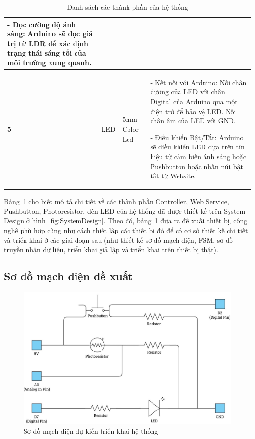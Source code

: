 {\begin{table}[!h]
\begin{tabular}{|p{0.6cm}|p{2.5cm}|p{3.5cm}|p{9cm}|}
- Đọc cường độ ánh sáng: Arduino sẽ đọc giá trị từ LDR để xác định trạng thái sáng tối của môi trường xung quanh. \\ \hline
\textbf{5} & LED & 5mm Color Led & 
- Kết nối với Arduino: Nối chân dương của LED với chân Digital của Arduino qua một điện trở để bảo vệ LED. Nối chân âm của LED với GND.

- Điều khiển Bật/Tắt: Arduino sẽ điều khiển LED dựa trên tín hiệu từ cảm biến ánh sáng hoặc Pushbutton hoặc nhấn nút bật tắt từ Website. \\ \hline
\end{tabular}

\caption{Danh sách các thành phần của hệ thống}
\label{tab:components}

\end{table}

Bảng~\ref{tab:components} cho biết mô tả chi tiết về các thành phần Controller, Web Service, Pushbutton, Photoresistor, đèn LED của hệ thống đã được thiết kế trên System Design ở hình~\ref{fig:SystemDesign}. Theo đó, bảng~\ref{tab:components} đưa ra đề xuất thiết bị, công nghệ phù hợp cũng như cách thiết lập các thiết bị đó để có cơ sở thiết kế chi tiết và triển khai ở các giai đoạn sau (như thiết kế sơ đồ mạch điện, FSM, sơ đồ truyền nhận dữ liệu, triển khai giả lập và triển khai trên thiết bị thật). 

\subsection{Sơ đồ mạch điện đề xuất}
\begin{figure}[H]
    \centering
    \includegraphics[scale=0.45]{img/Circuit.jpg}
    \caption{Sơ đồ mạch điện dự kiến triển khai hệ thống}
    \label{fig:Circuit}
\end{figure}

}
